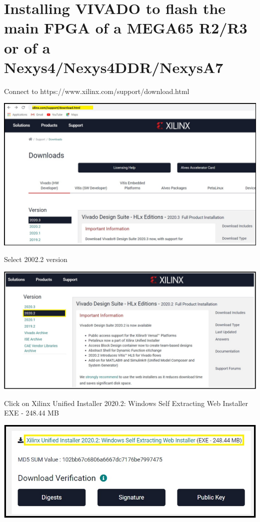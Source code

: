\section{Installing VIVADO to flash the main FPGA of a MEGA65 R2/R3 or of a Nexys4/Nexys4DDR/NexysA7}

Connect to https://www.xilinx.com/support/download.html

\includegraphics[width=\linewidth]{images/VivadoInstimg001.jpg}

Select 2002.2 version

\includegraphics[width=\linewidth]{images/VivadoInstimg002.jpg}

Click on Xilinx Unified Installer 2020.2: Windows Self Extracting Web Installer EXE - 248.44 MB

\includegraphics[width=\linewidth]{images/VivadoInstimg003.jpg}

